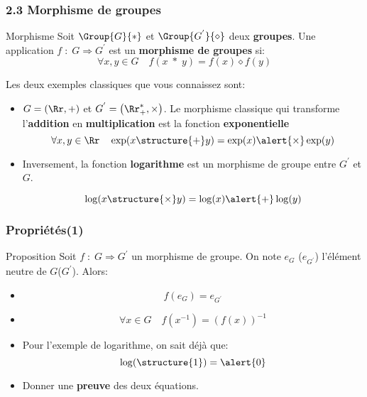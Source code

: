 \documentclass{beamer}
\begin{document}
\begin{frame}[t]
  \frametitle{2.3 Morphisme de groupes}
\begin{block}{Morphisme}
  \small
  Soit $\Group{G}{*}$ et $\Group{G^{'}}{\diamond}$ deux \textbf{groupes}. Une
  application $f\;:\; G\Longrightarrow G^{'}$ est un \textbf{\alert{morphisme de
  groupes}} si:
  \begin{equation}
    \forall x, y \in G \quad   f(x\; *\;y) = f(x)\diamond f(y)
  \end{equation}
\end{block}  
\pause

Les deux exemples classiques que vous connaissez sont:

\begin{itemize}
  \small
  \item $G = (\Rr, +)$ et $ G^{'}=\left(\Rr^{*}_+, \times\right)$. Le morphisme
    classique qui transforme l'\textbf{addition} en \textbf{multiplication}
    est la fonction \textbf{\alert{exponentielle}} \pause
    \begin{equation}
      \forall x, y \in \Rr\quad \exp(x \structure{+} y)= \exp(x)\alert{\times} \exp(y)
    \end{equation}
  \item Inversement, la fonction \textbf{\alert{logarithme}}  est un morphisme
    de groupe entre $G^{'}$ et $G$.

    \begin{equation}
      \log(x\structure{\times} y) =  \log(x) \alert{+} \log(y)
    \end{equation}
\end{itemize}
\end{frame}
\begin{frame}[t]
  \frametitle{Propriétés(1)}
 \begin{block}{Proposition}
   \small
   Soit $f\;:\; G\Longrightarrow G^{'}$ un morphisme de groupe. On note $e_{G}$
   ($e_{G^{'}}$) l'élément neutre de $G$($G^{'}$). Alors:

   \begin{itemize}
     \item \begin{equation}
         f(e_{G}) = e_{G^{'}}
     \end{equation}
   \item 
     \begin{equation}
       \forall x \in G\quad  f(x^{-1}) = \left(f\left(x\right)\right)^{-1}
     \end{equation}
   \end{itemize}
 \end{block} 

 \begin{itemize}
   \item Pour l'exemple de logarithme, on sait déjà que:
     \begin{equation}
       \log(\structure{1}) = \alert{0}
     \end{equation}
   \item Donner une \alert{\textbf{preuve}} des deux équations.
 \end{itemize}
\end{frame}
\end{document}
